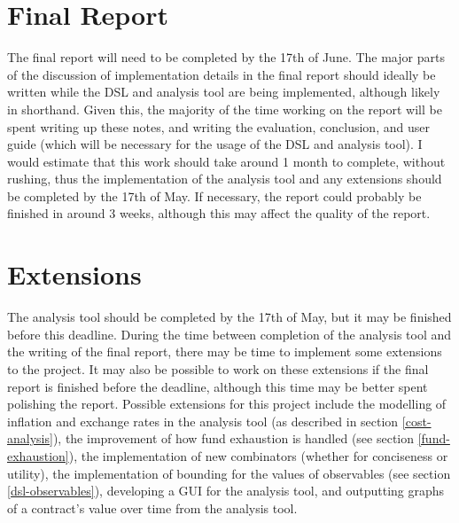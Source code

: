 \section{Final Report}

The final report will need to be completed by the 17th of June. The major parts of the discussion of implementation details in the final report should ideally be written while the DSL and analysis tool are being implemented, although likely in shorthand. Given this, the majority of the time working on the report will be spent writing up these notes, and writing the evaluation, conclusion, and user guide (which will be necessary for the usage of the DSL and analysis tool). I would estimate that this work should take around 1 month to complete, without rushing, thus the implementation of the analysis tool and any extensions should be completed by the 17th of May. If necessary, the report could probably be finished in around 3 weeks, although this may affect the quality of the report.

\section{Extensions}

The analysis tool should be completed by the 17th of May, but it may be finished before this deadline. During the time between completion of the analysis tool and the writing of the final report, there may be time to implement some extensions to the project. It may also be possible to work on these extensions if the final report is finished before the deadline, although this time may be better spent polishing the report. Possible extensions for this project include the modelling of inflation and exchange rates in the analysis tool (as described in section \ref{cost-analysis}), the improvement of how fund exhaustion is handled (see section \ref{fund-exhaustion}), the implementation of new combinators (whether for conciseness or utility), the implementation of bounding for the values of observables (see section \ref{dsl-observables}), developing a GUI for the analysis tool, and outputting graphs of a contract's value over time from the analysis tool.